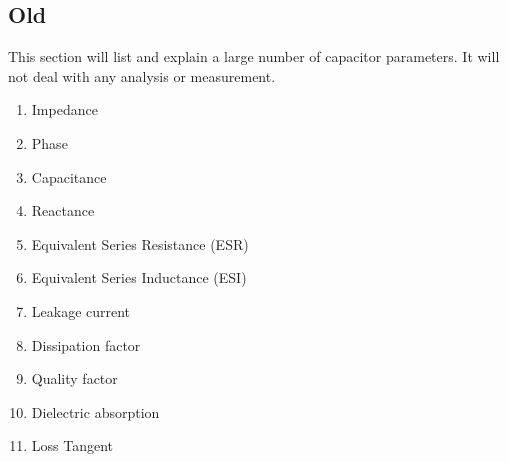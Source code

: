\subsection{Old}

This section will list and explain a large number of capacitor parameters. It will not deal with any analysis or measurement.

\begin {enumerate}
    \item Impedance
    \item Phase
    \item Capacitance
    \item Reactance
    \item Equivalent Series Resistance (ESR)
    \item Equivalent Series Inductance (ESI)
    \item Leakage current
    \item Dissipation factor
    \item Quality factor
    \item Dielectric absorption
    \item Loss Tangent
\end {enumerate}

